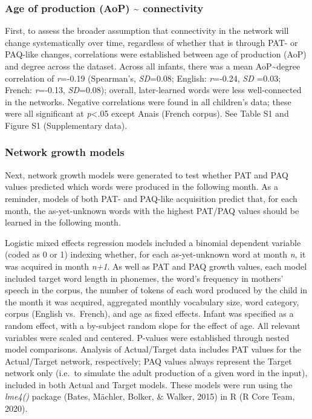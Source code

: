 \documentclass[
  man,mask,floatsintext]{apa6}
\begin{document}
\hypertarget{age-of-production-aop-connectivity}{%
\subsubsection{Age of production (AoP) \textasciitilde{} connectivity}\label{age-of-production-aop-connectivity}}

First, to assess the broader assumption that connectivity in the network will change systematically over time, regardless of whether that is through PAT- or PAQ-like changes, correlations were established between age of production (AoP) and degree across the dataset. Across all infants, there was a mean AoP\textasciitilde degree correlation of \emph{r}=-0.19 (Spearman's, \emph{SD}=0.08; English: \emph{r}=-0.24, \emph{SD} =0.03; French: \emph{r}=-0.13, \emph{SD}=0.08); overall, later-learned words were less well-connected in the networks. Negative correlations were found in all children's data; these were all significant at \emph{p}\textless.05 except Anais (French corpus). See Table S1 and Figure S1 (Supplementary data).

\hypertarget{network-growth-models-1}{%
\subsubsection{Network growth models}\label{network-growth-models-1}}

Next, network growth models were generated to test whether PAT and PAQ values predicted which words were produced in the following month. As a reminder, models of both PAT- and PAQ-like acquisition predict that, for each month, the as-yet-unknown words with the highest PAT/PAQ values should be learned in the following month.

Logistic mixed effects regression models included a binomial dependent variable (coded as 0 or 1) indexing whether, for each as-yet-unknown word at month \emph{n}, it was acquired in month \emph{n+1}. As well as PAT and PAQ growth values, each model included target word length in phonemes, the word's frequency in mothers' speech in the corpus, the number of tokens of each word produced by the child in the month it was acquired, aggregated monthly vocabulary size, word category, corpus (English vs.~French), and age as fixed effects. Infant was specified as a random effect, with a by-subject random slope for the effect of age. All relevant variables were scaled and centered. P-values were established through nested model comparisons. Analysis of Actual/Target data includes PAT values for the Actual/Target network, respectively; PAQ values always represent the Target network only (i.e.~to simulate the adult production of a given word in the input), included in both Actual and Target models. These models were run using the \emph{lme4()} package (Bates, Mächler, Bolker, \& Walker, 2015) in R (R Core Team, 2020).
\end{document}
